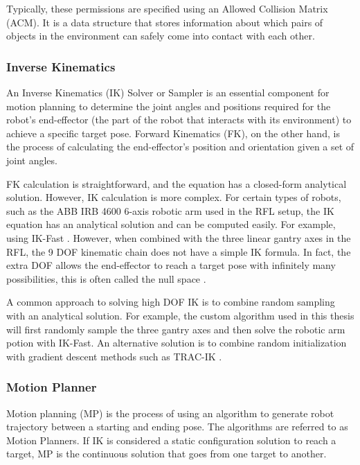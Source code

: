 Typically, these permissions are specified using an Allowed Collision Matrix (ACM). It is a data structure that stores information about which pairs of objects in the environment can safely come into contact with each other.

\subsubsection{Inverse Kinematics}
\label{subsubsection:exploration_2_inverse_kinematics}

An Inverse Kinematics (IK) Solver or Sampler is an essential component for motion planning to determine the joint angles and positions required for the robot's end-effector (the part of the robot that interacts with its environment) to achieve a specific target pose. Forward Kinematics (FK), on the other hand, is the process of calculating the end-effector's position and orientation given a set of joint angles.

FK calculation is straightforward, and the equation has a closed-form analytical solution. However, IK calculation is more complex. For certain types of robots, such as the ABB IRB 4600 6-axis robotic arm used in the RFL setup, the IK equation has an analytical solution and can be computed easily. For example, using IK-Fast \parencite{diankovOpenRAVEPlanningArchitecture2008}. However, when combined with the three linear gantry axes in the RFL, the 9 DOF kinematic chain does not have a simple IK formula. In fact, the extra DOF allows the end-effector to reach a target pose with infinitely many possibilities, this is often called the null space \parencite{craigIntroductionRobotics2006}.

A common approach to solving high DOF IK is to combine random sampling with an analytical solution. For example, the custom algorithm used in this thesis will first randomly sample the three gantry axes and then solve the robotic arm potion with IK-Fast. An alternative solution is to combine random initialization with gradient descent methods such as TRAC-IK \parencite{beesonTRACIKOpensourceLibrary2015}. 

\subsubsection{Motion Planner}
\label{subsubsection:exploration_2_motion_planner}

Motion planning (MP) is the process of using an algorithm to generate robot trajectory between a starting and ending pose. The algorithms are referred to as Motion Planners.  If IK is considered a static configuration solution to reach a target, MP is the continuous solution that goes from one target to another. 

